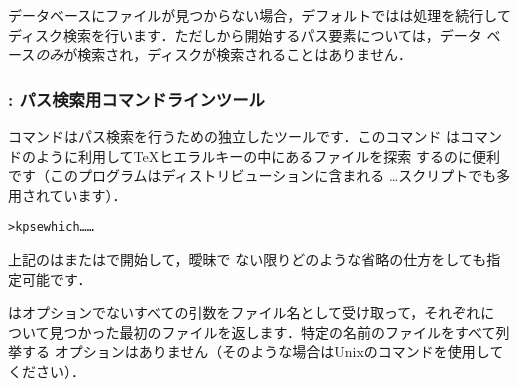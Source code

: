 \documentclass[uplatex,dvipdfmx,tombow]{jsarticle}
\begin{document}
データベースにファイルが見つからない場合，デフォルトでは\KPS は処理を続行して
ディスク検索を行います．ただし\samp{!!}から開始するパス要素については，データ
ベース\emph{のみ}が検索され，ディスクが検索されることはありません．

\subsubsection{: パス検索用コマンドラインツール}
\label{sec:invoking-kpsewhich}

コマンドはパス検索を行うための独立したツールです．このコマンド
はコマンドのように利用して\TeX ヒエラルキーの中にあるファイルを探索
するのに便利です（このプログラムはディストリビューションに含まれる%
\dots スクリプトでも多用されています）．
%
\begin{alltt}
> kpsewhich \dots{} \dots{}
\end{alltt}

上記のは\samp{\sopt{}}または\samp{\lopt{}}で開始して，曖昧で
ない限りどのような省略の仕方をしても指定可能です．

\KPS はオプションでないすべての引数をファイル名として受け取って，それぞれに
ついて見つかった最初のファイルを返します．特定の名前のファイルをすべて列挙する
オプションはありません（そのような場合はUnixのコマンドを使用して
ください）．
\end{document}
